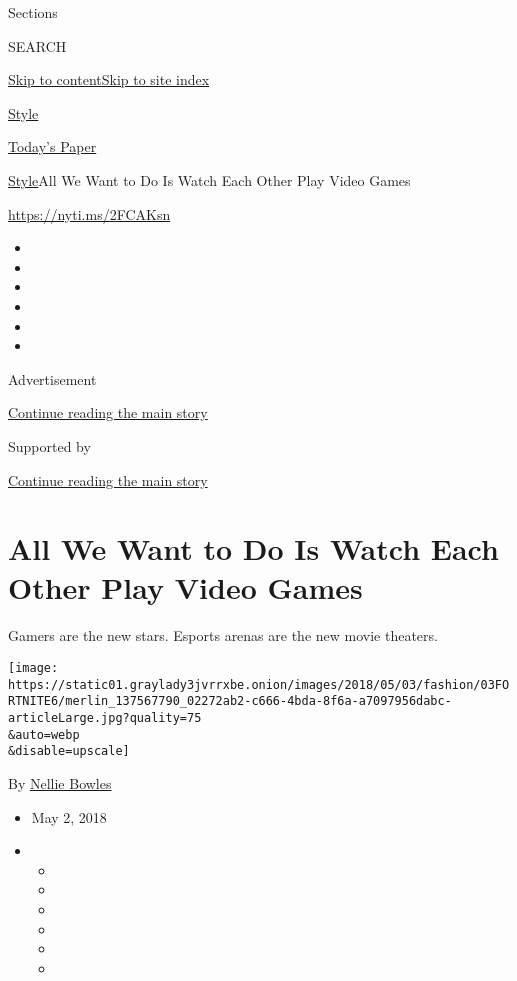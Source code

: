 Sections

SEARCH

\protect\hyperlink{site-content}{Skip to
content}\protect\hyperlink{site-index}{Skip to site index}

\href{https://www.nytimes3xbfgragh.onion/section/style}{Style}

\href{https://myaccount.nytimes3xbfgragh.onion/auth/login?response_type=cookie\&client_id=vi}{}

\href{https://www.nytimes3xbfgragh.onion/section/todayspaper}{Today's
Paper}

\href{/section/style}{Style}\textbar{}All We Want to Do Is Watch Each
Other Play Video Games

\url{https://nyti.ms/2FCAKsn}

\begin{itemize}
\item
\item
\item
\item
\item
\item
\end{itemize}

Advertisement

\protect\hyperlink{after-top}{Continue reading the main story}

Supported by

\protect\hyperlink{after-sponsor}{Continue reading the main story}

\hypertarget{all-we-want-to-do-is-watch-each-other-play-video-games}{%
\section{All We Want to Do Is Watch Each Other Play Video
Games}\label{all-we-want-to-do-is-watch-each-other-play-video-games}}

Gamers are the new stars. Esports arenas are the new movie theaters.

\texttt{[image: https://static01.graylady3jvrrxbe.onion/images/2018/05/03/fashion/03FORTNITE6/merlin\_137567790\_02272ab2-c666-4bda-8f6a-a7097956dabc-articleLarge.jpg?quality=75\\\&auto=webp\\\&disable=upscale]}

By \href{https://www.nytimes3xbfgragh.onion/by/nellie-bowles}{Nellie
Bowles}

\begin{itemize}
\item
  May 2, 2018
\item
  \begin{itemize}
  \item
  \item
  \item
  \item
  \item
  \item
  \end{itemize}
\end{itemize}

